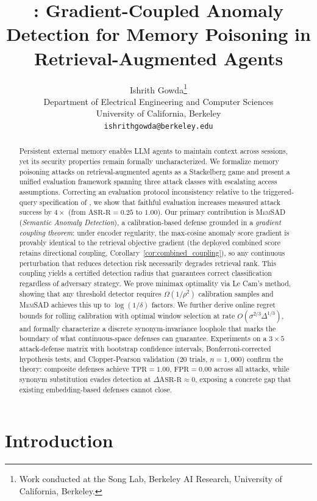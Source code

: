 \documentclass{article}
\title{\texorpdfstring{\memsad{}}{MemSAD}: Gradient-Coupled Anomaly Detection for Memory Poisoning in Retrieval-Augmented Agents}
\author{%
  Ishrith Gowda\thanks{Work conducted at the Song Lab, Berkeley AI Research, University of California, Berkeley.}\\
  Department of Electrical Engineering and Computer Sciences\\
  University of California, Berkeley\\
  \texttt{ishrithgowda@berkeley.edu}
}
\theoremstyle{definition}
\newcommand{\asrr}{\text{ASR-R}}
\newcommand{\tpr}{\text{TPR}}
\newcommand{\fpr}{\text{FPR}}
\newcommand{\memsad}{\textnormal{\textsc{MemSAD}}}
\begin{document}
\maketitle

\begin{abstract}
Persistent external memory enables LLM agents to maintain context across sessions, yet its security properties remain formally uncharacterized. We formalize memory poisoning attacks on retrieval-augmented agents as a Stackelberg game and present a unified evaluation framework spanning three attack classes with escalating access assumptions. Correcting an evaluation protocol inconsistency relative to the triggered-query specification of \citet{chen2024agentpoison}, we show that faithful evaluation increases measured attack success by $4\times$ (from $\asrr = 0.25$ to $1.00$). Our primary contribution is \memsad{} (\emph{Semantic Anomaly Detection}), a calibration-based defense grounded in a \emph{gradient coupling theorem}: under encoder regularity, the max-cosine anomaly score gradient is provably identical to the retrieval objective gradient (the deployed combined score retains directional coupling, Corollary~\ref{cor:combined_coupling}), so any continuous perturbation that reduces detection risk necessarily degrades retrieval rank. This coupling yields a certified detection radius that guarantees correct classification regardless of adversary strategy. We prove minimax optimality via Le Cam's method, showing that any threshold detector requires $\Omega(1/\rho^2)$ calibration samples and \memsad{} achieves this up to $\log(1/\delta)$ factors. We further derive online regret bounds for rolling calibration with optimal window selection at rate $O(\sigma^{2/3}\Delta^{1/3})$, and formally characterize a discrete synonym-invariance loophole that marks the boundary of what continuous-space defenses can guarantee. Experiments on a $3 \times 5$ attack-defense matrix with bootstrap confidence intervals, Bonferroni-corrected hypothesis tests, and Clopper-Pearson validation (20 trials, $n=1{,}000$) confirm the theory: composite defenses achieve $\tpr = 1.00$, $\fpr = 0.00$ across all attacks, while synonym substitution evades detection at $\Delta\asrr \approx 0$, exposing a concrete gap that existing embedding-based defenses cannot close.
\end{abstract}

\section{Introduction}
\label{sec:intro}
\end{document}
